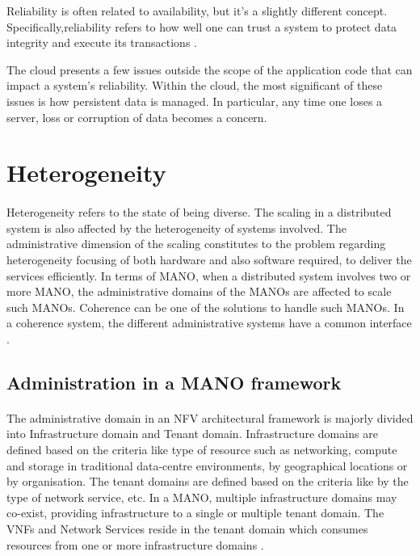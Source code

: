 Reliability is often related to availability, but it’s a slightly different concept. Specifically,reliability refers to how well one can trust a system to protect data integrity and execute its transactions \cite{reese_cloud_nodate}.

The cloud presents a few issues outside the scope of the application code that can impact a system’s reliability. Within the cloud, the most significant of these issues is how persistent data is managed. In particular, any time one loses a server, loss or corruption of data becomes a concern.

\section{Heterogeneity}
\paragraph{}Heterogeneity refers to the state of being diverse. The scaling in a distributed system is also affected by the heterogeneity of systems involved. The administrative dimension of the scaling constitutes to the problem regarding heterogeneity focusing of both hardware and also software required, to deliver the services efficiently. In terms of MANO, when a distributed system involves two or more MANO, the administrative domains of the MANOs are affected to scale such MANOs. Coherence can be one of the solutions to handle such MANOs. In a coherence system, the different administrative systems have a common interface \cite{ord1994scale}.



\subsection{Administration in a MANO framework}
\paragraph{}The administrative domain in an NFV architectural framework is majorly divided into Infrastructure domain and Tenant domain. Infrastructure domains are defined based on the criteria like type of resource such as networking, compute and storage in traditional data-centre environments, by geographical locations or by organisation. The tenant domains are defined based on the criteria like by the type of network service, etc. In a MANO, multiple infrastructure domains may co-exist, providing infrastructure to a single or multiple tenant domain. The VNFs and Network Services reside in the tenant domain which consumes resources from one or more infrastructure domains \cite{peinetwork}.

